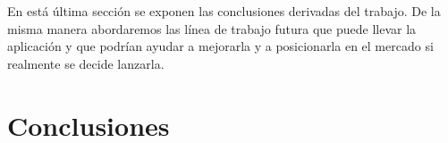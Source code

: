 
En está última sección se exponen las conclusiones derivadas del trabajo. De la misma manera abordaremos las línea de trabajo futura que puede llevar la aplicación y que podrían ayudar a mejorarla y a posicionarla en el mercado si realmente se decide lanzarla.


  \section{Conclusiones}\label{conclusiones}
